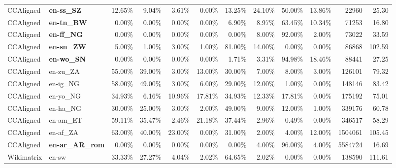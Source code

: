 \begin{table*}[hbt!]
{\begin{tabular}{l|l|rrrr|rrrr|rr}
            CCAligned  & \textbf{en-ss\_SZ}      & 12.65\%  & 9.04\%   & 3.61\%  & 0.00\%  & 13.25\% & 24.10\% & 50.00\% & 13.86\% & 22960       & 25.30             \\
            CCAligned  & \textbf{en-tn\_BW}      & 0.00\%   & 0.00\%   & 0.00\%  & 0.00\%  & 6.90\%  & 8.97\%  & 63.45\% & 10.34\% & 71253       & 16.80             \\
            CCAligned  & \textbf{en-ff\_NG}      & 0.00\%   & 0.00\%   & 0.00\%  & 0.00\%  & 0.00\%  & 8.00\%  & 92.00\% & 2.00\%  & 73022       & 33.59             \\
            CCAligned  & \textbf{en-sn\_ZW}      & 5.00\%   & 1.00\%   & 3.00\%  & 1.00\%  & 81.00\% & 14.00\% & 0.00\%  & 0.00\%  & 86868       & 102.59            \\
            CCAligned  & \textbf{en-wo\_SN}      & 0.00\%   & 0.00\%   & 0.00\%  & 0.00\%  & 1.71\%  & 3.31\%  & 94.98\% & 18.46\% & 88441       & 27.25             \\
            CCAligned  & en-zu\_ZA               & 55.00\%  & 39.00\%  & 3.00\%  & 13.00\% & 30.00\% & 7.00\%  & 8.00\%  & 3.00\%  & 126101      & 79.32             \\
            CCAligned  & en-ig\_NG               & 58.00\%  & 49.00\%  & 3.00\%  & 6.00\%  & 29.00\% & 12.00\% & 1.00\%  & 0.00\%  & 148146      & 83.42             \\
            CCAligned  & en-yo\_NG               & 34.93\%  & 6.16\%   & 10.96\% & 17.81\% & 34.93\% & 12.33\% & 17.81\% & 0.00\%  & 175192      & 75.01             \\
            CCAligned  & en-ha\_NG               & 30.00\%  & 25.00\%  & 3.00\%  & 2.00\%  & 49.00\% & 9.00\%  & 12.00\% & 1.00\%  & 339176      & 60.78             \\
            CCAligned  & en-am\_ET               & 59.11\%  & 35.47\%  & 2.46\%  & 21.18\% & 37.44\% & 2.96\%  & 0.49\%  & 0.00\%  & 346517      & 58.29             \\
            CCAligned  & en-af\_ZA               & 63.00\%  & 40.00\%  & 23.00\% & 0.00\%  & 31.00\% & 2.00\%  & 4.00\%  & 12.00\% & 1504061     & 105.45            \\
            CCAligned  & \textbf{en-ar\_AR\_rom} & 0.00\%   & 0.00\%   & 0.00\%  & 0.00\%  & 0.00\%  & 4.00\%  & 96.00\% & 4.00\%  & 5584724     & 16.69             \\
            Wikimatrix & en-sw                   & 33.33\%  & 27.27\%  & 4.04\%  & 2.02\%  & 64.65\% & 2.02\%  & 0.00\%  & 0.00\%  & 138590      & 111.61            \\

\end{tabular}}
\end{table*}
